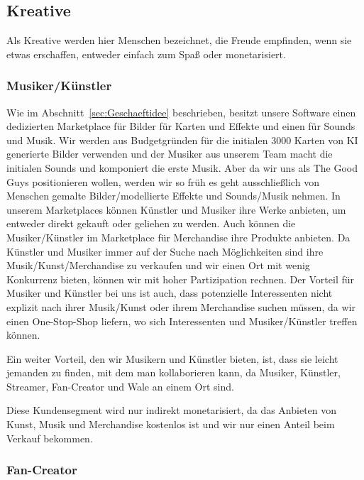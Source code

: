 \documentclass[fontsize=12, a4aper]{scrartcl}
\begin{document}
\subsection{Kreative} \label{subsec:Kreative}

Als Kreative werden hier Menschen bezeichnet, die Freude empfinden, wenn sie etwas erschaffen, entweder einfach zum Spaß oder monetarisiert.

\subsubsection{Musiker/Künstler} \label{subsubsec:Musiker_Kuenstler}

Wie im Abschnitt~\ref{sec:Geschaeftidee} beschrieben, besitzt unsere Software einen dedizierten Marketplace für Bilder für Karten und Effekte und einen für Sounds und Musik. Wir werden aus Budgetgründen für die initialen 3000 Karten von KI generierte Bilder verwenden und der Musiker aus unserem Team macht die initialen Sounds und komponiert die erste Musik. Aber da wir uns als \glqq The Good Guys\grqq{} positionieren wollen, werden wir so früh es geht ausschließlich von Menschen gemalte Bilder/modellierte Effekte und Sounds/Musik nehmen. In unserem Marketplaces können Künstler und Musiker ihre Werke anbieten, um entweder direkt gekauft oder geliehen zu werden. Auch können die Musiker/Künstler im Marketplace für Merchandise ihre Produkte anbieten. Da Künstler und Musiker immer auf der Suche nach Möglichkeiten sind ihre Musik/Kunst/Merchandise zu verkaufen und wir einen Ort mit wenig Konkurrenz bieten, können wir mit hoher Partizipation rechnen. Der Vorteil für Musiker und Künstler bei uns ist auch, dass potenzielle Interessenten nicht explizit nach ihrer Musik/Kunst oder ihrem Merchandise suchen müssen, da wir einen One-Stop-Shop liefern, wo sich Interessenten und Musiker/Künstler treffen können.\hfill\newline

\noindent Ein weiter Vorteil, den wir Musikern und Künstler bieten, ist, dass sie leicht jemanden zu finden, mit dem man kollaborieren kann, da Musiker, Künstler, Streamer, Fan-Creator und Wale an einem Ort sind.\hfill\newline

\noindent Diese Kundensegment wird nur indirekt monetarisiert, da das Anbieten von Kunst, Musik und Merchandise kostenlos ist und wir nur einen Anteil beim Verkauf bekommen.

\subsubsection{Fan-Creator} \label{subsubsec:Fan_Creator}
\end{document}
